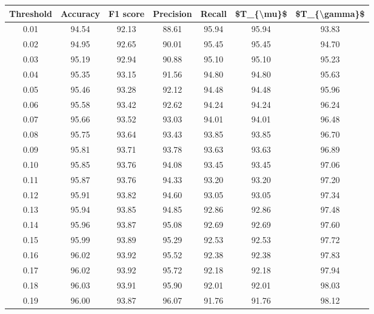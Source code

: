 \begin{tabular}{|c|c|c|c|c|c|c|}
\hline
 Threshold &  Accuracy &  F1 score &  Precision &  Recall &  \$T\_\{\textbackslash mu\}\$ &  \$T\_\{\textbackslash gamma\}\$ \\
\hline
      0.01 &     94.54 &     92.13 &      88.61 &   95.94 &      95.94 &         93.83 \\
      0.02 &     94.95 &     92.65 &      90.01 &   95.45 &      95.45 &         94.70 \\
      0.03 &     95.19 &     92.94 &      90.88 &   95.10 &      95.10 &         95.23 \\
      0.04 &     95.35 &     93.15 &      91.56 &   94.80 &      94.80 &         95.63 \\
      0.05 &     95.46 &     93.28 &      92.12 &   94.48 &      94.48 &         95.96 \\
      0.06 &     95.58 &     93.42 &      92.62 &   94.24 &      94.24 &         96.24 \\
      0.07 &     95.66 &     93.52 &      93.03 &   94.01 &      94.01 &         96.48 \\
      0.08 &     95.75 &     93.64 &      93.43 &   93.85 &      93.85 &         96.70 \\
      0.09 &     95.81 &     93.71 &      93.78 &   93.63 &      93.63 &         96.89 \\
      0.10 &     95.85 &     93.76 &      94.08 &   93.45 &      93.45 &         97.06 \\
      0.11 &     95.87 &     93.76 &      94.33 &   93.20 &      93.20 &         97.20 \\
      0.12 &     95.91 &     93.82 &      94.60 &   93.05 &      93.05 &         97.34 \\
      0.13 &     95.94 &     93.85 &      94.85 &   92.86 &      92.86 &         97.48 \\
      0.14 &     95.96 &     93.87 &      95.08 &   92.69 &      92.69 &         97.60 \\
      0.15 &     95.99 &     93.89 &      95.29 &   92.53 &      92.53 &         97.72 \\
      0.16 &     96.02 &     93.92 &      95.52 &   92.38 &      92.38 &         97.83 \\
      0.17 &     96.02 &     93.92 &      95.72 &   92.18 &      92.18 &         97.94 \\
      0.18 &     96.03 &     93.91 &      95.90 &   92.01 &      92.01 &         98.03 \\
      0.19 &     96.00 &     93.87 &      96.07 &   91.76 &      91.76 &         98.12 \\

\end{tabular}
